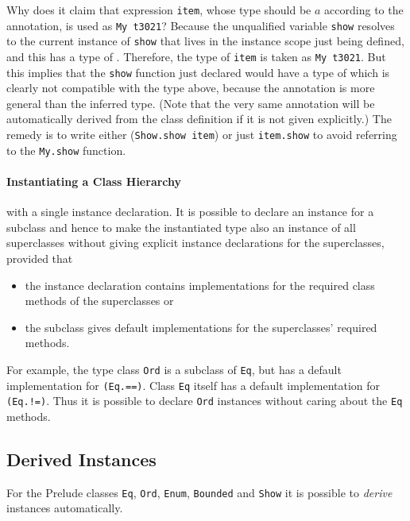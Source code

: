 Why does it claim that expression \texttt{item}, whose type should be $a$ according to the annotation, is used as \texttt{My t3021}? Because the unqualified variable \texttt{show} resolves to the current instance of \texttt{show} that lives in the instance scope just being defined, and this has a type of .
Therefore, the type of \texttt{item} is taken as \texttt{My t3021}. But this implies that the \texttt{show} function just declared would have a type of 
which is clearly not compatible with the type above, because the annotation is more general than the inferred type. (Note that the very same annotation will be automatically derived from the class definition if it is not given explicitly.)
The remedy is to write either (\texttt{Show.show item}) or just \texttt{item.show} to avoid referring to the \texttt{My.show} function.

\paragraph{Instantiating a Class Hierarchy} with a single instance declaration. It is possible to declare an instance for a subclass and hence to make the instantiated type also an instance of all superclasses without giving explicit instance declarations for the superclasses, provided that
\begin{itemize}
\item the instance declaration contains implementations for the required class methods of the superclasses or
\item the subclass gives default implementations for the superclasses' required methods.
\end{itemize}
For example, the type class \texttt{Ord} is a subclass of \texttt{Eq}, but has a default implementation for \texttt{(Eq.==)}.
Class \texttt{Eq} itself has a default implementation for \texttt{(Eq.!=)}.
Thus it is possible to declare  \texttt{Ord} instances without caring about the \texttt{Eq} methods.


\subsection{Derived Instances} \label{derivedcl}

For the Prelude classes \texttt{Eq}, \texttt{Ord}, \texttt{Enum}, \texttt{Bounded} and \texttt{Show} it is possible to \emph{derive} instances automatically.

\begin{flushleft}
       
\end{flushleft}

